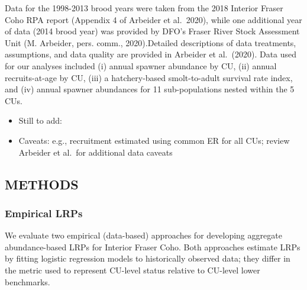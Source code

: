\documentclass[11pt]{book}
\begin{document}
Data for the 1998-2013 brood years were taken from the 2018 Interior Fraser Coho RPA report (Appendix 4 of Arbeider et al.~2020), while one additional year of data (2014 brood year) was provided by DFO's Fraser River Stock Assessment Unit (M. Arbeider, pers. comm., 2020).Detailed descriptions of data treatments, assumptions, and data quality are provided in Arbeider et al.~(2020). Data used for our analyses included (i) annual spawner abundance by CU, (ii) annual recruits-at-age by CU, (iii) a hatchery-based smolt-to-adult survival rate index, and (iv) annual spawner abundances for 11 sub-populations nested within the 5 CUs.
\begin{itemize}

\item
  Still to add:
\item
  Caveats: e.g., recruitment estimated using common ER for all CUs; review Arbeider et al.~for additional data caveats
\end{itemize}
\hypertarget{methods}{%
\subsection{METHODS}\label{methods}}

\hypertarget{empirical-lrps}{%
\subsubsection{Empirical LRPs}\label{empirical-lrps}}

We evaluate two empirical (data-based) approaches for developing aggregate abundance-based LRPs for Interior Fraser Coho. Both approaches estimate LRPs by fitting logistic regression models to historically observed data; they differ in the metric used to represent CU-level status relative to CU-level lower benchmarks.
\end{document}
